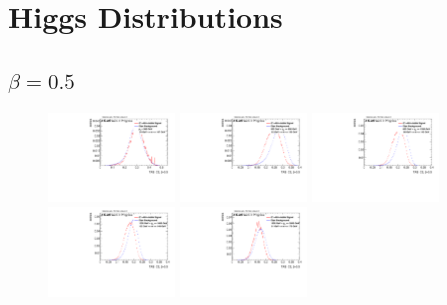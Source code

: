 \section{Higgs Distributions}
\subsection*{$\beta=0.5$}
\begin{figure}
\includegraphics[width=0.3\textwidth]{sascha_input/Appendix/Distributions/higgs/distributions/beta05/h_assisted_tj_C2_05_bin1.pdf} \hspace{1mm}
\includegraphics[width=0.3\textwidth]{sascha_input/Appendix/Distributions/higgs/distributions/beta05/h_assisted_tj_C2_05_bin2.pdf} \hspace{4mm}
\includegraphics[width=0.3\textwidth]{sascha_input/Appendix/Distributions/higgs/distributions/beta05/h_assisted_tj_C2_05_bin3.pdf} 
\bigskip
\includegraphics[width=0.3\textwidth]{sascha_input/Appendix/Distributions/higgs/distributions/beta05/h_assisted_tj_C2_05_bin4.pdf} \hspace{4mm}
\includegraphics[width=0.3\textwidth]{sascha_input/Appendix/Distributions/higgs/distributions/beta05/h_assisted_tj_C2_05_bin5.pdf} 


\end{figure}
